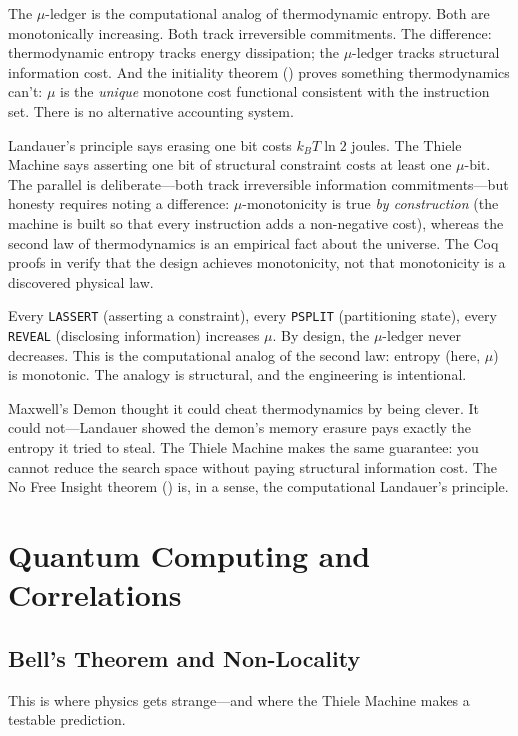 The $\mu$-ledger is the computational analog of thermodynamic entropy. Both are monotonically increasing. Both track irreversible commitments. The difference: thermodynamic entropy tracks energy dissipation; the $\mu$-ledger tracks structural information cost. And the initiality theorem () proves something thermodynamics can't: $\mu$ is the \emph{unique} monotone cost functional consistent with the instruction set. There is no alternative accounting system.

Landauer's principle says erasing one bit costs $k_B T \ln 2$ joules. The Thiele Machine says asserting one bit of structural constraint costs at least one $\mu$-bit. The parallel is deliberate---both track irreversible information commitments---but honesty requires noting a difference: $\mu$-monotonicity is true \textit{by construction} (the machine is built so that every instruction adds a non-negative cost), whereas the second law of thermodynamics is an empirical fact about the universe. The Coq proofs in  verify that the design achieves monotonicity, not that monotonicity is a discovered physical law.

Every \texttt{LASSERT} (asserting a constraint), every \texttt{PSPLIT} (partitioning state), every \texttt{REVEAL} (disclosing information) increases $\mu$. By design, the $\mu$-ledger never decreases. This is the computational analog of the second law: entropy (here, $\mu$) is monotonic. The analogy is structural, and the engineering is intentional.

Maxwell's Demon thought it could cheat thermodynamics by being clever. It could not---Landauer showed the demon's memory erasure pays exactly the entropy it tried to steal. The Thiele Machine makes the same guarantee: you cannot reduce the search space without paying structural information cost. The No Free Insight theorem () is, in a sense, the computational Landauer's principle.

\section{Quantum Computing and Correlations}

\subsection{Bell's Theorem and Non-Locality}

This is where physics gets strange---and where the Thiele Machine makes a testable prediction.

